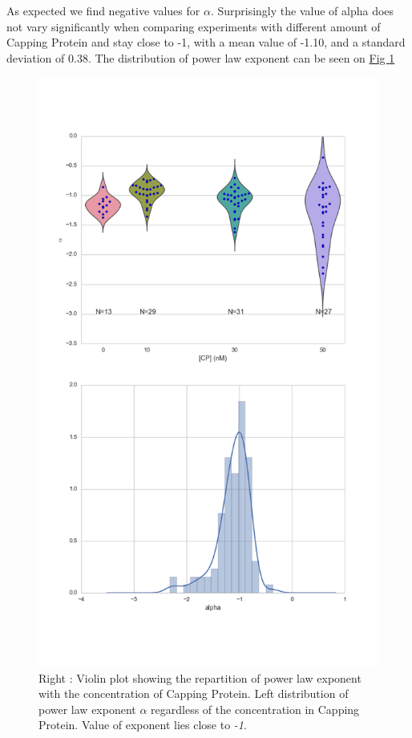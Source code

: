 \documentclass[A4paperpaper,11pt,english]{sphinxmanual}
\begin{document}
As expected we find negative values for \(\alpha\). Surprisingly the value
of alpha does not vary significantly when comparing experiments with different
amount of Capping Protein and stay close to -1, with a mean value of -1.10, and
a standard deviation of 0.38. The distribution of power law exponent can be
seen on \hyperref[parts/part3:power-law-exponent]{Fig  \ref*{parts/part3:power-law-exponent}}
\begin{figure}[htbp]
\centering
\capstart

\includegraphics[width=0.900\linewidth]{alpha_violin.png}
\caption{Right : Violin plot showing the repartition of power law exponent with the
concentration of Capping Protein. Left distribution of power law exponent
\(\alpha\) regardless of the concentration in Capping Protein. Value of
exponent lies close to \emph{-1}.}\label{parts/part3:power-law-exponent}\end{figure}
\end{document}
